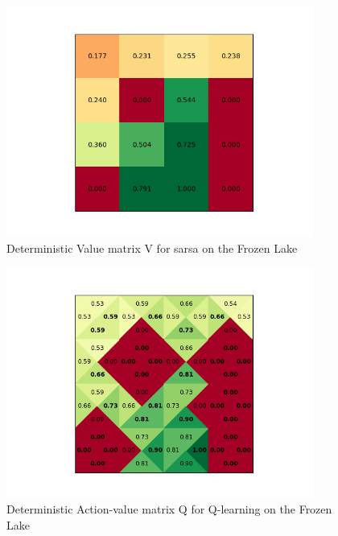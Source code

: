 \documentclass{article}
\begin{document}
\begin{figure}[H]
\centering
\includegraphics[width=0.9\textwidth]{figures/V_sarsa_det.png}
\caption{Deterministic Value matrix V for sarsa on the Frozen Lake}
\label{fig:V_sarsa_det}
\end{figure}



\begin{figure}[H]
\centering
\includegraphics[width=0.9\textwidth]{figures/Q_q_det.png}
\caption{Deterministic Action-value matrix Q for Q-learning on the Frozen Lake}
\label{fig:Q_q_det}
\end{figure}
\end{document}
